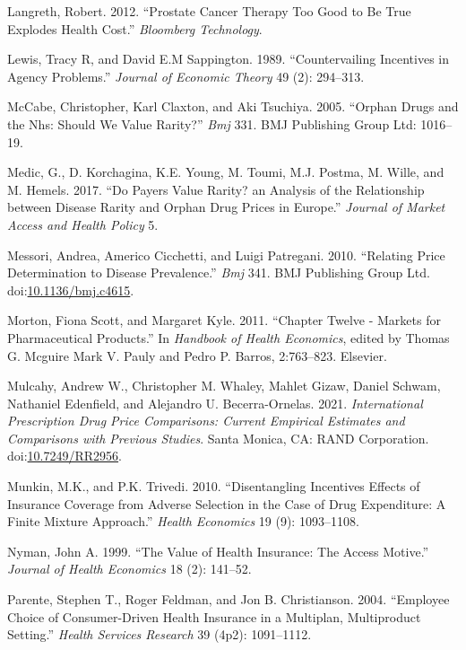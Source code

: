 \documentclass[a4paper,12pt]{article}
\begin{document}
\hypertarget{citeproc_bib_item_27}{Langreth, Robert. 2012. “Prostate Cancer Therapy Too Good to Be True Explodes Health Cost.” \textit{Bloomberg Technology}.}

\hypertarget{citeproc_bib_item_28}{Lewis, Tracy R, and David E.M Sappington. 1989. “Countervailing Incentives in Agency Problems.” \textit{Journal of Economic Theory} 49 (2): 294–313.}

\hypertarget{citeproc_bib_item_29}{McCabe, Christopher, Karl Claxton, and Aki Tsuchiya. 2005. “Orphan Drugs and the Nhs: Should We Value Rarity?” \textit{Bmj} 331. BMJ Publishing Group Ltd: 1016–19.}

\hypertarget{citeproc_bib_item_30}{Medic, G., D. Korchagina, K.E. Young, M. Toumi, M.J. Postma, M. Wille, and M. Hemels. 2017. “Do Payers Value Rarity? an Analysis of the Relationship between Disease Rarity and Orphan Drug Prices in Europe.” \textit{Journal of Market Access and Health Policy} 5.}

\hypertarget{citeproc_bib_item_31}{Messori, Andrea, Americo Cicchetti, and Luigi Patregani. 2010. “Relating Price Determination to Disease Prevalence.” \textit{Bmj} 341. BMJ Publishing Group Ltd. doi:\href{https://doi.org/10.1136/bmj.c4615}{10.1136/bmj.c4615}.}

\hypertarget{citeproc_bib_item_32}{Morton, Fiona Scott, and Margaret Kyle. 2011. “Chapter Twelve - Markets for Pharmaceutical Products.” In \textit{Handbook of Health Economics}, edited by Thomas G. Mcguire Mark V. Pauly and Pedro P. Barros, 2:763–823. Elsevier.}

\hypertarget{citeproc_bib_item_33}{Mulcahy, Andrew W., Christopher M. Whaley, Mahlet Gizaw, Daniel Schwam, Nathaniel Edenfield, and Alejandro U. Becerra-Ornelas. 2021. \textit{International Prescription Drug Price Comparisons: Current Empirical Estimates and Comparisons with Previous Studies}. Santa Monica, CA: RAND Corporation. doi:\href{https://doi.org/10.7249/RR2956}{10.7249/RR2956}.}

\hypertarget{citeproc_bib_item_34}{Munkin, M.K., and P.K. Trivedi. 2010. “Disentangling Incentives Effects of Insurance Coverage from Adverse Selection in the Case of Drug Expenditure: A Finite Mixture Approach.” \textit{Health Economics} 19 (9): 1093–1108.}

\hypertarget{citeproc_bib_item_35}{Nyman, John A. 1999. “The Value of Health Insurance: The Access Motive.” \textit{Journal of Health Economics} 18 (2): 141–52.}

\hypertarget{citeproc_bib_item_36}{Parente, Stephen T., Roger Feldman, and Jon B. Christianson. 2004. “Employee Choice of Consumer-Driven Health Insurance in a Multiplan, Multiproduct Setting.” \textit{Health Services Research} 39 (4p2): 1091–1112.}
\end{document}
